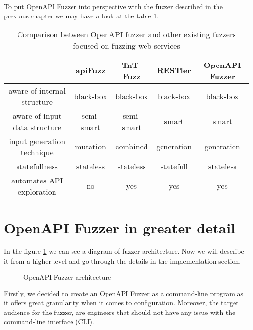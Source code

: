 \paragraph{}
To put OpenAPI Fuzzer into perspective with the fuzzer described in the previous chapter we may have a look at the table \ref{table:openapi-fuzzers-comparison}.

\begin{table}[h]
\begin{center}
\begin{tabular}{|c|c c c c|}
\hline
                              & apiFuzz    & TnT-Fuzz   & RESTler    & \textbf{OpenAPI Fuzzer} \\
\hline
aware of internal structure   & black-box  & black-box  & black-box  & black-box               \\
aware of input data structure & semi-smart & semi-smart & smart      & smart                   \\
input generation technique    & mutation   & combined   & generation & generation              \\
statefullness                 & stateless  & stateless  & statefull  & stateless               \\
automates API exploration     & no         & yes        & yes        & yes                     \\
\hline
\end{tabular}
\caption{Comparison between OpenAPI fuzzer and other existing fuzzers focused on fuzzing web services}
\label{table:openapi-fuzzers-comparison}
\end{center}
\end{table}

\newpage
\section{OpenAPI Fuzzer in greater detail}
In the figure \ref{fig:fuzzer-architecture} we can see a diagram of fuzzer architecture. Now we will describe it from a higher level and go through the details in the implementation section.

\begin{figure}[h]
    \center
    \def\svgwidth{\columnwidth}
    \scalebox{0.7}{}
    \caption{OpenAPI Fuzzer architecture}
    \label{fig:fuzzer-architecture}
\end{figure}

Firstly, we decided to create an OpenAPI Fuzzer as a command-line program as it offers great granularity when it comes to configuration. Moreover, the target audience for the fuzzer, are engineers that should not have any issue with the command-line interface (CLI).

